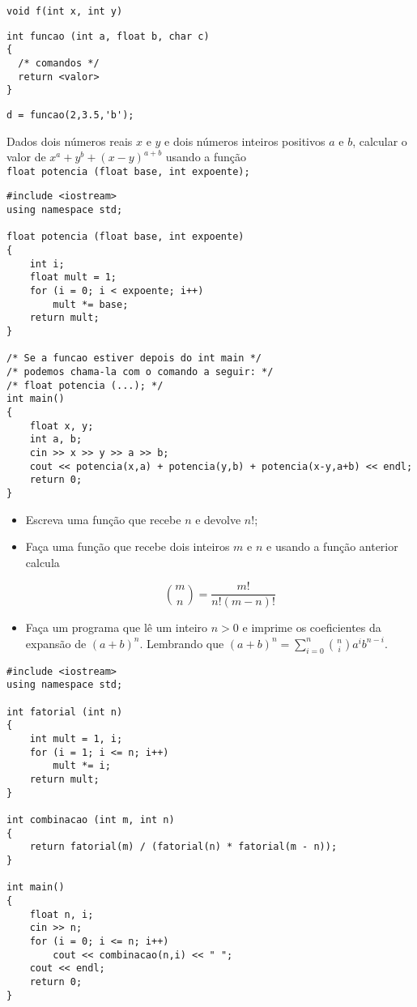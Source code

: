 \documentclass[a4paper]{memoir}
\begin{document}
\verb|void f(int x, int y)|

\begin{lstlisting}
int funcao (int a, float b, char c)
{
  /* comandos */
  return <valor>
}
\end{lstlisting}

\verb|d = funcao(2,3.5,'b');|

\begin{prob}\label{prob209.cpp}
Dados dois números reais $x$ e $y$ e dois números inteiros positivos $a$ e $b$, calcular o valor de $x^a + y^b + (x - y)^{a + b}$ usando a função\\
\verb|float potencia (float base, int expoente);|
\end{prob}

\begin{sol}
\begin{lstlisting}
#include <iostream>
using namespace std;

float potencia (float base, int expoente)
{
    int i;
    float mult = 1;
    for (i = 0; i < expoente; i++)
        mult *= base;
    return mult;
}

/* Se a funcao estiver depois do int main */
/* podemos chama-la com o comando a seguir: */
/* float potencia (...); */
int main()
{
    float x, y;
    int a, b;
    cin >> x >> y >> a >> b;
    cout << potencia(x,a) + potencia(y,b) + potencia(x-y,a+b) << endl;
    return 0;
}
\end{lstlisting}
\end{sol}

\begin{prob}\label{prob210.cpp}
\begin{itemize}
 \item Escreva uma função que recebe $n$ e devolve $n!$;
 \item Faça uma função que recebe dois inteiros $m$ e $n$ e usando a função anterior calcula

\[
{m \choose n} = \frac{m!}{n!(m - n)!}
\]

  \item Faça um programa que lê um inteiro $n > 0$ e imprime os coeficientes da expansão de $(a + b)^n$. Lembrando que $(a + b)^n  = \sum\limits_{i = 0}^n {{n \choose i} a^i b^{n - i} }$.
\end{itemize}
\end{prob}

\begin{sol}
\begin{lstlisting}
#include <iostream>
using namespace std;

int fatorial (int n)
{
    int mult = 1, i;
    for (i = 1; i <= n; i++)
        mult *= i;
    return mult;
}

int combinacao (int m, int n)
{
    return fatorial(m) / (fatorial(n) * fatorial(m - n));
}

int main()
{
    float n, i;
    cin >> n;
    for (i = 0; i <= n; i++)
        cout << combinacao(n,i) << " ";
    cout << endl;
    return 0;
}
\end{lstlisting}
\end{sol}
\end{document}
